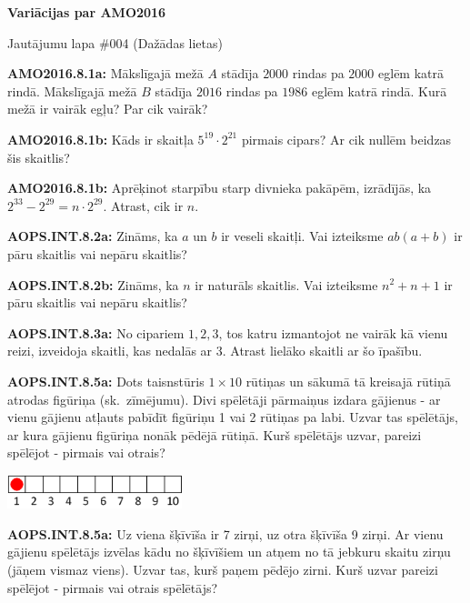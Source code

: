 \documentclass[11pt]{article}
\newenvironment{uzdevums}[1][\unskip]{%
\vspace{3mm}
\noindent
\textbf{#1:}
\noindent}
{}
\begin{document}
\begin{center}
{\LARGE \bf Variācijas par AMO2016}
\end{center}

\begin{center}
{\large Jautājumu lapa \#004 (Dažādas lietas)}
\end{center}


\begin{uzdevums}[AMO2016.8.1a]
Mākslīgajā mežā $A$ stādīja $2000$ rindas pa $2000$ eglēm katrā rindā. 
Mākslīgajā mežā $B$ stādīja $2016$ rindas pa $1986$ eglēm katrā rindā. 
Kurā mežā ir vairāk egļu? Par cik vairāk?
\end{uzdevums}

\begin{uzdevums}[AMO2016.8.1b]
Kāds ir skaitļa $5^{19} \cdot 2^{21}$ pirmais cipars? Ar cik nullēm beidzas šis skaitlis?
\end{uzdevums}

\begin{uzdevums}[AMO2016.8.1b]
Aprēķinot starpību starp divnieka pakāpēm, izrādījās, ka $2^{33} - 2^{29} = n \cdot 2^{29}$. 
Atrast, cik ir $n$. 
\end{uzdevums}

\begin{uzdevums}[AOPS.INT.8.2a]
Zināms, ka $a$ un $b$ ir veseli skaitļi. Vai izteiksme $ab(a+b)$ ir pāru skaitlis vai nepāru skaitlis?
\end{uzdevums}

\begin{uzdevums}[AOPS.INT.8.2b]
Zināms, ka $n$ ir naturāls skaitlis. Vai izteiksme $n^2 + n + 1$ ir pāru skaitlis vai nepāru skaitlis?
\end{uzdevums}

\begin{uzdevums}[AOPS.INT.8.3a]
No cipariem $1,2,3$, tos katru izmantojot ne vairāk kā vienu reizi, izveidoja skaitli, kas nedalās ar 3. 
Atrast lielāko skaitli ar šo īpašību. 
\end{uzdevums}

\begin{uzdevums}[AOPS.INT.8.5a]
Dots taisnstūris $1 \times 10$ rūtiņas un sākumā tā kreisajā rūtiņā atrodas figūriņa (sk.\ zīmējumu). 
Divi spēlētāji pārmaiņus izdara gājienus - ar vienu gājienu atļauts pabīdīt figūriņu 1 vai 2 rūtiņas pa labi. 
Uzvar tas spēlētājs, ar kura gājienu figūriņa nonāk pēdējā rūtiņā. 
Kurš spēlētājs uzvar, pareizi spēlējot - pirmais vai otrais?
\begin{center}
\includegraphics[width=2in]{test-amo2016-8-5a.png}
\end{center}
\end{uzdevums}


\begin{uzdevums}[AOPS.INT.8.5a]
Uz viena šķīvīša ir 7 zirņi, uz otra šķīvīša 9 zirņi. Ar vienu gājienu spēlētājs izvēlas 
kādu no šķīvīšiem un atņem no tā jebkuru skaitu zirņu (jāņem vismaz viens). Uzvar tas, kurš paņem 
pēdējo zirni. Kurš 
uzvar pareizi spēlējot - pirmais vai otrais spēlētājs?
\end{uzdevums}
\end{document}
